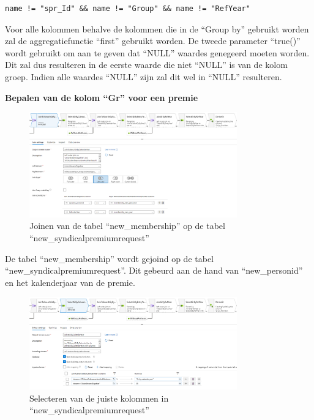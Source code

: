\begin{verbatim}
name != "spr_Id" && name != "Group" && name != "RefYear"
\end{verbatim}

Voor alle kolommen behalve de kolommen die in de ``Group by'' gebruikt worden zal de aggregatiefunctie ``first'' gebruikt worden. De tweede parameter ``true()'' wordt gebruikt om aan te geven dat ``NULL'' waardes genegeerd moeten worden. Dit zal dus resulteren in de eerste waarde die niet ``NULL'' is van de kolom groep. Indien alle waardes ``NULL'' zijn zal dit wel in ``NULL'' resulteren.



\pagebreak

\textbf{Bepalen van de kolom ``Gr'' voor een premie}

\begin{figure}[H]
    \centering
    \includegraphics[width=0.8\textwidth]{./graphics/adf/gr_1.png}
    \caption{Joinen van de tabel ``new\_membership'' op de tabel ``new\_syndicalpremiumrequest''}
\end{figure}

De tabel ``new\_membership'' wordt gejoind op de tabel ``new\_syndicalpremiumrequest''. Dit gebeurd aan de hand van ``new\_personid'' en het kalenderjaar van de premie.

\begin{figure}[H]
    \centering
    \includegraphics[width=0.8\textwidth]{./graphics/adf/gr_2.png}
    \caption{Selecteren van de juiste kolommen in ``new\_syndicalpremiumrequest''}
\end{figure}

